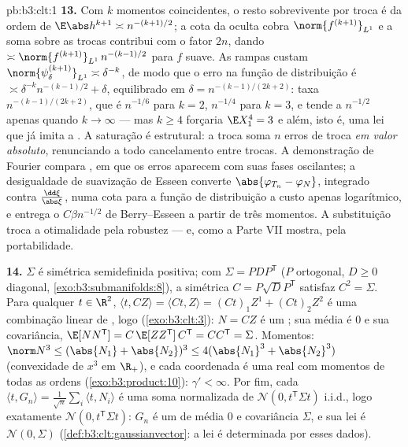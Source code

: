 \begin{solution}{pb:b3:clt:1}
\textbf{13.} Com $k$ momentos coincidentes, o resto
sobrevivente por troca é da ordem de $\E\abs h^{k+1} \asymp
n^{-(k+1)/2}$; a cota da  oculta cobra
$\norm{f^{(k+1)}}_{L^1}$ e a soma sobre as trocas contribui com
o fator $2n$, dando $\asymp\norm{f^{(k+1)}}_{L^1}\,
n^{-(k-1)/2}$ para $f$ suave. As rampas custam
$\norm{\psi_\delta^{(k+1)}}_{L^1} \asymp \delta^{-k}$, de modo que
o erro na função de distribuição é $\asymp
\delta^{-k}n^{-(k-1)/2} + \delta$, equilibrado em $\delta =
n^{-(k-1)/(2k+2)}$: taxa $n^{-(k-1)/(2k+2)}$, que é
$n^{-1/6}$ para $k = 2$, $n^{-1/4}$ para $k = 3$, e tende
a $n^{-1/2}$ apenas quando $k \to \infty$ --- mas $k \geq 4$
forçaria $\E X_1^4 = 3$ e além, isto é, uma lei que
já imita a . A saturação é
estrutural: a troca soma $n$ erros de troca \emph{em
valor absoluto}, renunciando a todo cancelamento entre
trocas. A demonstração de Fourier compara ,
em que os erros aparecem com suas fases oscilantes;
a desigualdade de suavização de Esseen converte $\abs{\varphi_{T_n}
- \varphi_N}$, integrado contra $\frac{\dd\xi}{\abs\xi}$,
numa cota para a função de distribuição a custo apenas
logarítmico, e entrega o $C\beta n^{-1/2}$ de Berry--Esseen a partir de
três momentos. A substituição troca a otimalidade pela
robustez --- e, como a Parte VII mostra, pela portabilidade.

\textbf{14.} $\Sigma$ é simétrica semidefinida positiva;
com $\Sigma = PDP^{\mathsf T}$ ($P$ ortogonal, $D \geq 0$
diagonal, \cref{exo:b3:submanifolds:8}), a simétrica $C =
P\sqrt DP^{\mathsf T}$ satisfaz $C^2 = \Sigma$. Para qualquer $t
\in \R^2$, $\langle t, CZ\rangle = \langle Ct, Z\rangle =
(Ct)_1Z^1 + (Ct)_2Z^2$ é uma combinação linear de
 , logo 
(\cref{exo:b3:clt:3}): $N = CZ$ é um ; sua
média é $0$ e sua covariância, $\E[NN^{\mathsf T}] =
C\,\E[ZZ^{\mathsf T}]\,C^{\mathsf T} = CC^{\mathsf T} =
\Sigma$. Momentos: $\norm N^3 \leq (\abs{N_1} +
\abs{N_2})^3 \leq 4(\abs{N_1}^3 + \abs{N_2}^3)$ (convexidade
de $x^3$ em $\R_+$), e cada coordenada é uma 
real com momentos de todas as ordens
(\cref{exo:b3:product:10}): $\gamma' < \infty$. Por fim,
cada $\langle t, G_n\rangle = \frac1{\sqrt
n}\sum_i\langle t, N_i\rangle$ é uma soma normalizada de
$\mathcal N(0, t^{\mathsf T}\Sigma t)$ i.i.d., logo
exatamente $\mathcal N(0, t^{\mathsf T}\Sigma t)$: $G_n$ é um
 de média $0$ e covariância $\Sigma$, e
sua lei é $\mathcal N(0, \Sigma)$
(\cref{def:b3:clt:gaussianvector}: a lei é determinada
por esses dados).


\end{solution}

